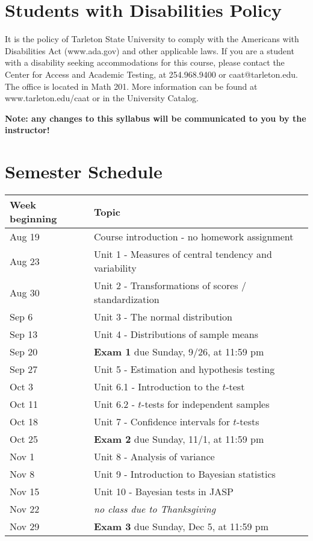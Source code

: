 \documentclass[10pt]{article}
\begin{document}
\section*{Students with Disabilities Policy}
\label{sec:orgd5b6e8a}

It is the policy of Tarleton State University to comply with the Americans with Disabilities  Act (www.ada.gov) and other applicable laws.  If you are a student with a disability seeking accommodations for this course, please contact the Center for Access and Academic Testing, at 254.968.9400 or caat@tarleton.edu. The office is located in Math 201. More information can be found at www.tarleton.edu/caat or in the University Catalog.​

\textbf{Note:  any changes to this syllabus will be communicated to you by the instructor!}

\section*{Semester Schedule}
\label{sec:org2eb1c32}

\begin{center}
\begin{tabular}{ll}
Week beginning & Topic\\
\hline
Aug 19 & Course introduction - no homework assignment\\
Aug 23 & Unit 1 - Measures of central tendency and variability\\
Aug 30 & Unit 2 - Transformations of scores / standardization\\
Sep 6 & Unit 3 - The normal distribution\\
Sep 13 & Unit 4 - Distributions of sample means\\
Sep 20 & \textbf{Exam 1} due Sunday, 9/26, at 11:59 pm\\
Sep 27 & Unit 5 - Estimation and hypothesis testing\\
Oct 3 & Unit 6.1 - Introduction to the \(t\)-test\\
Oct 11 & Unit 6.2 - \(t\)-tests for independent samples\\
Oct 18 & Unit 7 - Confidence intervals for \(t\)-tests\\
Oct 25 & \textbf{Exam 2} due Sunday, 11/1, at 11:59 pm\\
Nov 1 & Unit 8 - Analysis of variance\\
Nov 8 & Unit 9 - Introduction to Bayesian statistics\\
Nov 15 & Unit 10 - Bayesian tests in JASP\\
Nov 22 & \emph{no class due to Thanksgiving}\\
Nov 29 & \textbf{Exam 3} due Sunday, Dec 5, at 11:59 pm\\
\end{tabular}
\end{center}
\end{document}
